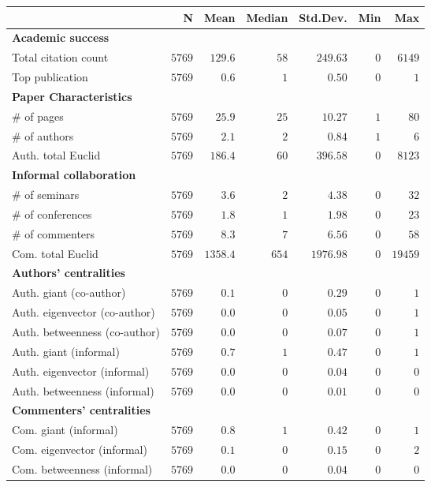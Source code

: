 \begin{tabular}{lrrrrrr}
\toprule
&N&Mean&Median&Std.Dev.&Min&Max\tabularnewline
\midrule
\textbf{Academic success}\\
Total citation count&$5769$&$ 129.6$&$ 58$&$ 249.63$&$0$&$ 6149$\tabularnewline
Top publication&$5769$&$   0.6$&$  1$&$   0.50$&$0$&$    1$\tabularnewline
\midrule\textbf{Paper Characteristics}\\
\# of pages&$5769$&$  25.9$&$ 25$&$  10.27$&$1$&$   80$\tabularnewline
\# of authors&$5769$&$   2.1$&$  2$&$   0.84$&$1$&$    6$\tabularnewline
Auth. total Euclid&$5769$&$ 186.4$&$ 60$&$ 396.58$&$0$&$ 8123$\tabularnewline
\midrule\textbf{Informal collaboration}\\
\# of seminars&$5769$&$   3.6$&$  2$&$   4.38$&$0$&$   32$\tabularnewline
\# of conferences&$5769$&$   1.8$&$  1$&$   1.98$&$0$&$   23$\tabularnewline
\# of commenters&$5769$&$   8.3$&$  7$&$   6.56$&$0$&$   58$\tabularnewline
Com. total Euclid&$5769$&$1358.4$&$654$&$1976.98$&$0$&$19459$\tabularnewline
\midrule\textbf{Authors' centralities}\\
Auth. giant (co-author)&$5769$&$   0.1$&$  0$&$   0.29$&$0$&$    1$\tabularnewline
Auth. eigenvector (co-author)&$5769$&$   0.0$&$  0$&$   0.05$&$0$&$    1$\tabularnewline
Auth. betweenness (co-author)&$5769$&$   0.0$&$  0$&$   0.07$&$0$&$    1$\tabularnewline
Auth. giant (informal)&$5769$&$   0.7$&$  1$&$   0.47$&$0$&$    1$\tabularnewline
Auth. eigenvector (informal)&$5769$&$   0.0$&$  0$&$   0.04$&$0$&$    0$\tabularnewline
Auth. betweenness (informal)&$5769$&$   0.0$&$  0$&$   0.01$&$0$&$    0$\tabularnewline
\midrule\textbf{Commenters' centralities}\\
Com. giant (informal)&$5769$&$   0.8$&$  1$&$   0.42$&$0$&$    1$\tabularnewline
Com. eigenvector (informal)&$5769$&$   0.1$&$  0$&$   0.15$&$0$&$    2$\tabularnewline
Com. betweenness (informal)&$5769$&$   0.0$&$  0$&$   0.04$&$0$&$    0$\tabularnewline
\bottomrule
\end{tabular}
